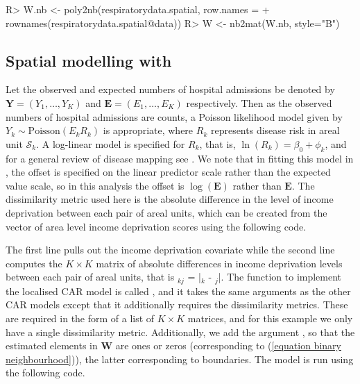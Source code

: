 \documentclass[article,shortnames,nojss]{jss}
\begin{document}
\begin{Schunk}
\begin{Sinput}
R> W.nb <- poly2nb(respiratorydata.spatial, row.names = 
+                 rownames(respiratorydata.spatial@data))
R> W <- nb2mat(W.nb, style="B")
\end{Sinput}
\end{Schunk}



\subsection[Spatial modelling with CARBayes]{Spatial modelling with }
Let the  observed and expected numbers of hospital admissions be denoted by $\mathbf{Y}=(Y_{1},\ldots,Y_{K})$ and $\mathbf{E}=(E_{1},\ldots,E_{K})$ respectively. Then as the observed numbers of hospital admissions are counts, a Poisson likelihood model given by $Y_{k}\sim\mbox{Poisson}(E_{{k}}R_{k})$ is appropriate, where $R_{k}$ represents disease risk in areal unit $\mathcal{S}_{k}$. A log-linear model is specified for $R_{k}$, that is, $\ln(R_{k})=\beta_{0}+\phi_{k}$, and for a general review of disease mapping see \cite{wakefield2007}. We note that in fitting this model in , the offset is specified on the linear predictor scale rather than the expected value scale, so in this analysis the offset is $\log(\mathbf{E})$ rather than $\mathbf{E}$. The dissimilarity metric used here is the absolute difference in the level of income deprivation between each pair of areal units, which can be created from the  vector of area level income deprivation scores using the following code.

\begin{Schunk}
\end{Schunk}

The first line pulls out the income deprivation covariate while the second line computes the $K\times K$ matrix of absolute differences in income deprivation levels between each pair of areal units, that is $_{kj}$ = |$_{k}$ - $_{j}$|. The function to implement the localised CAR model is called , and it takes the same arguments as the other CAR models except that it additionally requires the dissimilarity metrics. These are required in the form of a list of $K\times K$ matrices, and for this example we only have a single dissimilarity metric. Additionally, we add the argument , so that the estimated elements in $$ are ones or zeros (corresponding to (\ref{equation binary neighbourhood})), the latter corresponding to boundaries. The model is run using the following code.
\end{document}
